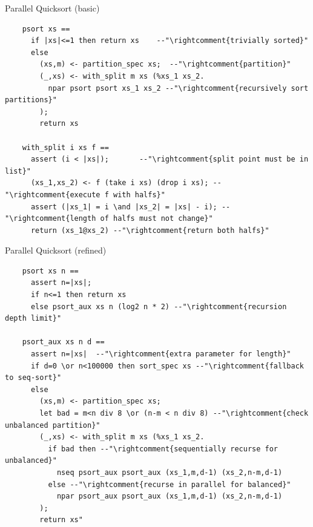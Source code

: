 \documentclass[fleqn]{beamer}
\begin{document}
\begin{frame}[fragile]{Parallel Quicksort (basic)}

  \begin{lstlisting}
    psort xs ==
      if |xs|<=1 then return xs    --"\rightcomment{trivially sorted}"
      else
        (xs,m) <- partition_spec xs;  --"\rightcomment{partition}"
        (_,xs) <- with_split m xs (%xs_1 xs_2.
          npar psort psort xs_1 xs_2 --"\rightcomment{recursively sort partitions}"
        );
        return xs

    with_split i xs f ==
      assert (i < |xs|);       --"\rightcomment{split point must be in list}"
      (xs_1,xs_2) <- f (take i xs) (drop i xs); --"\rightcomment{execute f with halfs}"
      assert (|xs_1| = i \and |xs_2| = |xs| - i); --"\rightcomment{length of halfs must not change}"
      return (xs_1@xs_2) --"\rightcomment{return both halfs}"

  \end{lstlisting}


\end{frame}
\begin{frame}[fragile]{Parallel Quicksort (refined)}
  \small
  \begin{lstlisting}
    psort xs n ==
      assert n=|xs|;
      if n<=1 then return xs
      else psort_aux xs n (log2 n * 2) --"\rightcomment{recursion depth limit}"

    psort_aux xs n d ==
      assert n=|xs|  --"\rightcomment{extra parameter for length}"
      if d=0 \or n<100000 then sort_spec xs --"\rightcomment{fallback to seq-sort}"
      else
        (xs,m) <- partition_spec xs;
        let bad = m<n div 8 \or (n-m < n div 8) --"\rightcomment{check unbalanced partition}"
        (_,xs) <- with_split m xs (%xs_1 xs_2.
          if bad then --"\rightcomment{sequentially recurse for unbalanced}"
            nseq psort_aux psort_aux (xs_1,m,d-1) (xs_2,n-m,d-1)
          else --"\rightcomment{recurse in parallel for balanced}"
            npar psort_aux psort_aux (xs_1,m,d-1) (xs_2,n-m,d-1)
        );
        return xs"

  \end{lstlisting}

\end{frame}
\end{document}
